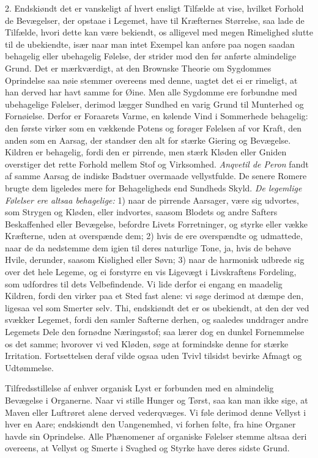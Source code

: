 \documentclass[12pt,a4paper]{article}
\newcommand{\opage}[1]{\marginnote{\footnotesize\textit{[#1]}}}
\begin{document}
2. Endskiøndt det er vanskeligt af hvert ensligt Tilfælde at vise, hvilket Forhold de
Bevægelser, der opstaae i Legemet, have til Kræfternes Størrelse, saa lade de Tilfælde,
hvori dette kan være bekiendt, os alligevel med megen Rimelighed slutte til de ubekiendte,
især naar man intet Exempel kan anføre paa nogen saadan behagelig eller ubehagelig Følelse,
der strider mod den før anførte almindelige Grund. Det er mærkværdigt, at den Brownske
Theorie om Sygdommes Oprindelse saa nøie stemmer overeens med denne, uagtet det ei er
rimeligt, at han derved har havt samme for Øine. Men alle Sygdomme ere forbundne med
ubehagelige
\opage{230} Følelser, derimod lægger Sundhed en varig Grund til Munterhed og Fornøielse. Derfor er
Foraarets Varme, en kølende Vind i Sommerhede behagelig: den første virker som en vækkende
Potens og forøger Følelsen af vor Kraft, den anden som en Aarsag, der standser den alt for
stærke Giering og Bevægelse. Kildren er behagelig, fordi den er pirrende, men stærk Kløden
eller Gniden overstiger det rette Forhold mellem Stof og Virksomhed. \emph{Anqvetil de
Peron} fandt af samme Aarsag de indiske Badstuer overmaade vellystfulde. De senere Romere
brugte dem ligeledes mere for Behageligheds end Sundheds Skyld. \emph{De legemlige Følelser
ere altsaa behagelige:} 1) naar de pirrende Aarsager, være sig udvortes, som Strygen og
Kløden, eller indvortes, saasom Blodets og andre Safters Beskaffenhed eller Bevægelse,
befordre Livets Forretninger, og styrke eller vække Kræfterne, uden at overspænde dem;
2) hvis de ere overspændte og udmattede, naar de da nedstemme dem igien til deres
naturlige Tone, ja, hvis de behøve Hvile, derunder, saasom Kiølighed eller Søvn; 3) naar de
harmonisk udbrede sig over det hele Legeme, og ei forstyrre en vis Ligevægt i Livskraftens
Fordeling, som udfordres til dets Velbefindende. Vi lide derfor ei engang en maadelig
Kildren, fordi den virker paa et Sted fast alene: vi søge derimod at dæmpe den, ligesaa vel
som Smerter selv. Thi, endskiøndt det er os ubekiendt, at den der%
\opage{231}ved svækker Legemet, fordi den samler Safterne derhen, og saaledes unddrager andre Legemets
Dele den fornødne Næringsstof; saa lærer dog en dunkel Fornemmelse os det samme; hvorover
vi ved Kløden, søge at formindske denne for stærke Irritation. Fortsettelsen deraf vilde
ogsaa uden Tvivl tilsidst bevirke Afmagt og Udtømmelse.

Tilfredsstillelse af enhver organisk Lyst er forbunden med en almindelig Bevægelse i
Organerne. Naar vi stille Hunger og Tørst, saa kan man ikke sige, at Maven eller Luftrøret
alene derved vederqvæges. Vi føle derimod denne Vellyst i hver en Aare; endskiøndt den
Uangenemhed, vi forhen følte, fra hine Organer havde sin Oprindelse. Alle Phænomener af
organiske Følelser stemme altsaa deri overeens, at Vellyst og Smerte i Svaghed og Styrke
have deres sidste Grund.
\end{document}
